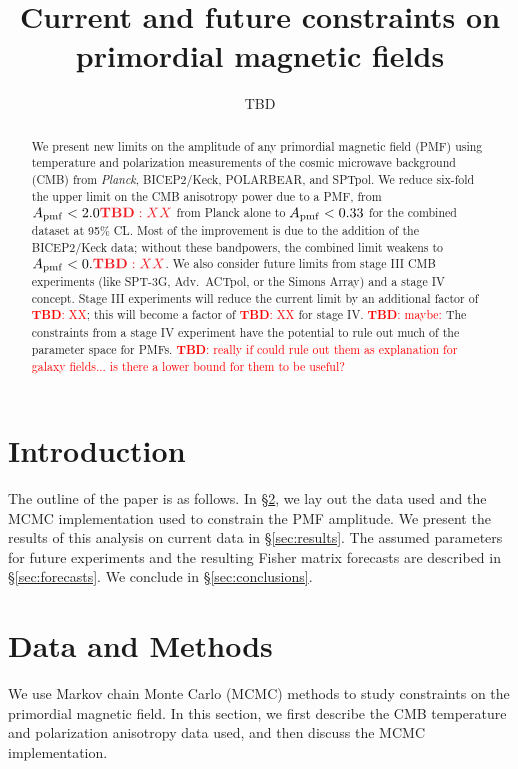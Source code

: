 \documentclass[preprint]{emulateapj}
\newcommand{\apmf}{\ensuremath{A_{\rm pmf}}}
\newcommand{\planck}{{\sl Planck}}
\newcommand{\bicepkeck}{BICEP2/Keck}
\newcommand{\sptnew}{SPT-3G}
\newcommand{\pb}{POLARBEAR}
\newcommand{\simons}{Simons Array}
\newcommand{\sptpol}{SPTpol}
\newcommand{\advactpol}{Adv.~ACTpol}
\newcommand{\tbd}[1]{\textcolor{Red}{{\bf TBD}: #1}}
\begin{document}
\title{Current and future constraints on primordial magnetic fields}
\author{TBD}


\begin{abstract}

We present new limits on the amplitude of any primordial magnetic field (PMF) using temperature and polarization measurements of the cosmic microwave background (CMB)  from \planck{}, \bicepkeck{}, \pb, and \sptpol. 
We reduce six-fold the upper limit on the CMB anisotropy power due to a PMF, from $\apmf < 2.0\tbd{XX}$ from Planck alone to $\apmf < 0.33$ for the combined dataset at 95\% CL. 
Most of the improvement is due to the addition of the \bicepkeck{} data; without these bandpowers, the combined limit weakens to $\apmf < 0.\tbd{XX}$. 
We also consider future limits from stage III CMB experiments (like \sptnew{},  \advactpol, or the \simons) and a stage IV concept. 
Stage III experiments will reduce the current limit by an additional factor of \tbd{XX}; this will become a factor of \tbd{XX} for stage IV. 
\tbd{maybe:} The constraints from a stage IV experiment have the potential to rule out much of the parameter space for PMFs. \tbd{really if could rule out them as explanation for galaxy fields... is there a lower bound for them to be useful?}

\end{abstract}

\section{Introduction}
\label{sec:intro}

The outline of the paper is as follows. 
In \S\ref{sec:data}, we lay out the data used and the MCMC implementation used to constrain the PMF amplitude. 
We present the results of this analysis on current data in \S\ref{sec:results}. 
The assumed parameters for future experiments and the resulting Fisher matrix forecasts are described in \S\ref{sec:forecasts}. 
We conclude in \S\ref{sec:conclusions}. 

\section{Data and Methods}
\label{sec:data}

We use  Markov chain Monte Carlo (MCMC) methods to study constraints on the primordial magnetic field. 
In this section, we first describe the CMB temperature and polarization anisotropy data used, and then discuss the MCMC implementation. 
\end{document}
